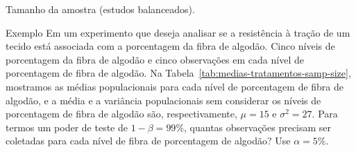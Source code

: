 \documentclass[8pt]{beamer}
\begin{document}
\begin{frame}{Tamanho da amostra (estudos balanceados).}

\begin{block}{Exemplo}
	Em um experimento que deseja analisar se a resistência à tração de um tecido está associada com a porcentagem da fibra de algodão. Cinco níveis de porcentagem da fibra de algodão e cinco observações em cada nível de porcentagem de fibra de algodão. Na Tabela~\ref{tab:medias-tratamentos-samp-size}, mostramos as médias populacionais para cada nível de porcentagem de fibra de algodão, e a média e a variância populacionais sem considerar os níveis de porcentagem de fibra de algodão são, respectivamente, $\mu = 15$ e $\sigma^2 = 27$. Para termos um poder de teste de $1-\beta = 99\%$, quantas observações precisam ser coletadas para cada nível de fibra de porcentagem de algodão? Use $\alpha = 5\%$. 
	\begin{table}[ht]
		\centering
		\caption{Médias para cada nível de porcentagem de fibra de algodão.} 
		\label{tab:medias-tratamentos-samp-size}
	\end{table}
\end{block}

\end{frame}
\end{document}
